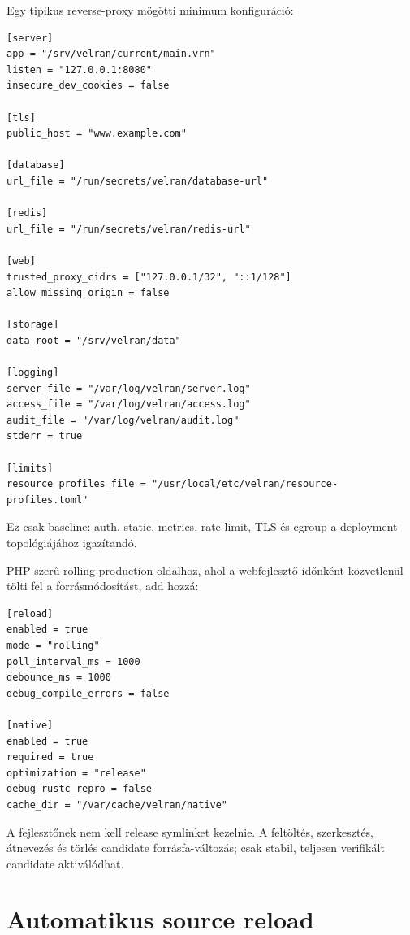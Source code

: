 Egy tipikus reverse-proxy mögötti minimum konfiguráció:

\begin{lstlisting}
[server]
app = "/srv/velran/current/main.vrn"
listen = "127.0.0.1:8080"
insecure_dev_cookies = false

[tls]
public_host = "www.example.com"

[database]
url_file = "/run/secrets/velran/database-url"

[redis]
url_file = "/run/secrets/velran/redis-url"

[web]
trusted_proxy_cidrs = ["127.0.0.1/32", "::1/128"]
allow_missing_origin = false

[storage]
data_root = "/srv/velran/data"

[logging]
server_file = "/var/log/velran/server.log"
access_file = "/var/log/velran/access.log"
audit_file = "/var/log/velran/audit.log"
stderr = true

[limits]
resource_profiles_file = "/usr/local/etc/velran/resource-profiles.toml"
\end{lstlisting}

Ez csak baseline: auth, static, metrics, rate-limit, TLS és cgroup a deployment topológiájához igazítandó.

PHP-szerű rolling-production oldalhoz, ahol a webfejlesztő időnként közvetlenül tölti fel a forrásmódosítást, add hozzá:

\begin{lstlisting}
[reload]
enabled = true
mode = "rolling"
poll_interval_ms = 1000
debounce_ms = 1000
debug_compile_errors = false

[native]
enabled = true
required = true
optimization = "release"
debug_rustc_repro = false
cache_dir = "/var/cache/velran/native"
\end{lstlisting}

A fejlesztőnek nem kell release symlinket kezelnie. A feltöltés, szerkesztés, átnevezés és törlés candidate forrásfa-változás; csak stabil, teljesen verifikált candidate aktiválódhat.


\section{Automatikus source reload}

